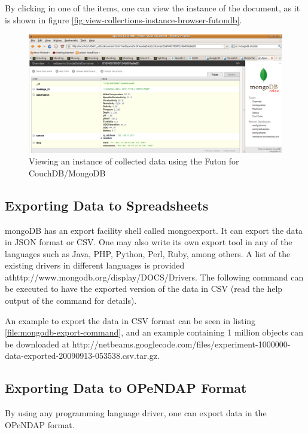 By clicking in one of the items, one can view the instance of the document, as
it is shown in figure \ref{fig:view-collections-instance-browser-futondb}.

\begin{figure}[h]
  \centering
  \includegraphics[scale=0.5]{../diagrams/view-collected-data-instance-browser-futondb}
  \caption{Viewing an instance of collected data using the Futon for
  CouchDB/MongoDB}
  \label{fig:view-collected-data-instance-browser-futondb}
\end{figure}

\subsection{Exporting Data to Spreadsheets}

mongoDB has an export facility shell called mongoexport. It can export the data
in JSON format or CSV. One may also write its own export tool in any of the
languages such as Java, PHP, Python, Perl, Ruby, among others. A list of the
existing drivers in different languages is provided
athttp://www.mongodb.org/display/DOCS/Drivers. The following command can be
executed to have the exported version of the data in CSV (read the help output
of the command for details).

An example to export the data in CSV format can be seen in listing
\ref{file:mongodb-export-command}, and an example containing 1 million objects can be
downloaded at
http://netbeams.googlecode.com/files/experiment-1000000-data-exported-20090913-053538.csv.tar.gz.

\subsection{Exporting Data to OPeNDAP Format}

By using any programming language driver, one can export data in the OPeNDAP
format.

